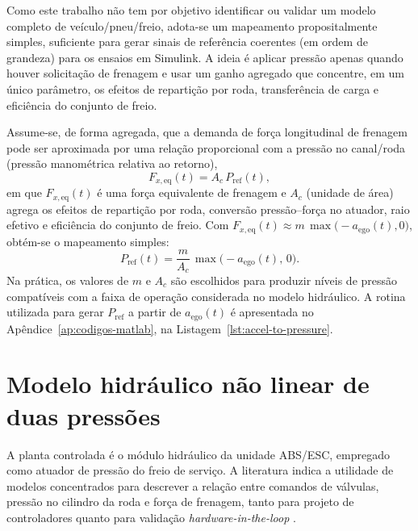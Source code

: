 Como este trabalho não tem por objetivo identificar ou validar um modelo completo de veículo/pneu/freio, adota-se um mapeamento propositalmente simples, suficiente para gerar sinais de referência coerentes (em ordem de grandeza) para os ensaios em Simulink. A ideia é aplicar pressão apenas quando houver solicitação de frenagem e usar um ganho agregado que concentre, em um único parâmetro, os efeitos de repartição por roda, transferência de carga e eficiência do conjunto de freio.

Assume-se, de forma agregada, que a demanda de força longitudinal de frenagem pode ser aproximada por uma relação proporcional com a pressão no canal/roda (pressão manométrica relativa ao retorno),
\begin{equation}
    F_{x,\mathrm{eq}}(t) = A_c\,P_{\mathrm{ref}}(t),
    \label{eq:fxeq_ac_pref}
\end{equation}
em que $F_{x,\mathrm{eq}}(t)$ é uma força equivalente de frenagem e $A_c$ (unidade de área) agrega os efeitos de repartição por roda, conversão pressão--força no atuador, raio efetivo e eficiência do conjunto de freio. Com $F_{x,\mathrm{eq}}(t)\approx m\,\max\big(-a_{\mathrm{ego}}(t),0\big)$, obtém-se o mapeamento simples:
\begin{equation}
    P_{\mathrm{ref}}(t) = \frac{m}{A_c}\,\max\big( -a_{\mathrm{ego}}(t),\,0\big).
    \label{eq:mapeamento_aref_pressao}
\end{equation}
Na prática, os valores de $m$ e $A_c$ são escolhidos para produzir níveis de pressão compatíveis com a faixa de operação considerada no modelo hidráulico. A rotina utilizada para gerar $P_{\mathrm{ref}}$ a partir de $a_{\mathrm{ego}}(t)$ é apresentada no Apêndice~\ref{ap:codigos-matlab}, na Listagem~\ref{lst:accel-to-pressure}.

\section{Modelo hidráulico não linear de duas pressões}
\label{sec:controle-4-1}
A planta controlada é o módulo hidráulico da unidade ABS/ESC, empregado como atuador de pressão do freio de serviço. A literatura indica a utilidade de modelos concentrados para descrever a relação entre comandos de válvulas, pressão no cilindro da roda e força de frenagem, tanto para projeto de controladores quanto para validação \emph{hardware-in-the-loop} \cite{HouhuaJing2022,PressureCoordinatedControl2023,ZengYangHuang2023,MotorParametricDesign2023}.

